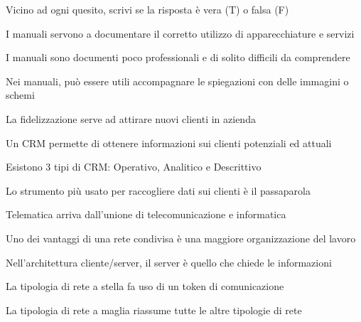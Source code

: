 \documentclass[addpoints]{exam}
\newcommand{\tf}[1][{}]{%
	\fillin[#1][0.25in]%
}
\begin{document}
 
\begin{center}
\end{center}

\vspace{5mm}

 
\vspace{10mm}

Vicino ad ogni quesito, scrivi se la risposta è vera (T) o falsa (F)
\begin{multicols}{2}

\begin{questions}

\question[1] \tf[T] I manuali servono a documentare il corretto utilizzo di apparecchiature e servizi

\question[1] \tf[F] I manuali sono documenti poco professionali e di solito difficili da comprendere

\question[1] \tf[T] Nei manuali, può essere utili accompagnare le spiegazioni con delle immagini o schemi

\question[1] \tf[F] La fidelizzazione serve ad attirare nuovi clienti in azienda

\question[1] \tf[T] Un CRM permette di ottenere informazioni sui clienti potenziali ed attuali

\question[1] \tf[F] Esistono 3 tipi di CRM: Operativo, Analitico e Descrittivo

\question[1] \tf[F] Lo strumento più usato per raccogliere dati sui clienti è il passaparola

\question[1] \tf[T] Telematica arriva dall'unione di telecomunicazione e informatica

\question[1] \tf[T] Uno dei vantaggi di una rete condivisa è una maggiore organizzazione del lavoro

\question[1] \tf[F] Nell'architettura cliente/server, il server è quello che chiede le informazioni

\question[1] \tf[F] La tipologia di rete a stella fa uso di un token di comunicazione

\question[1] \tf[T] La tipologia di rete a maglia riassume tutte le altre tipologie di rete


\end{questions}
\end{multicols}
\end{document}
